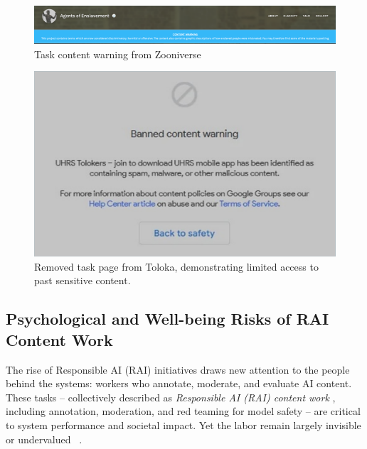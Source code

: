 \begin{figure}
  \centering
  \includegraphics[width=\linewidth]{figures/warning_zooniverse.pdf}
  \caption{Task content warning from Zooniverse}
  \label{fig:zooniverse_removed}
\end{figure}

\begin{figure}
  \centering
  \includegraphics[width=0.7\linewidth]{figures/toloka_removed_task.pdf}
  \caption{Removed task page from Toloka, demonstrating limited access to past sensitive content.}
  \label{fig:toloka_removed}
\end{figure}


\subsection{Psychological and Well-being Risks of RAI Content Work} 
The rise of Responsible AI (RAI) initiatives draws new attention to the people behind the systems: workers who annotate, moderate, and evaluate AI content. These tasks -- collectively described as \textit{Responsible AI (RAI) content work} \cite{qian2025aura}, including annotation, moderation, and red teaming for model safety -- are critical to system performance and societal impact. Yet the labor remain largely invisible or undervalued ~\cite{gray2019ghost}. 

